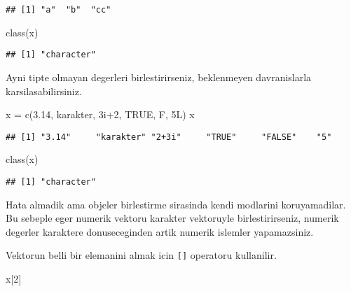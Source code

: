 \documentclass[
]{book}
\newenvironment{Shaded}{\begin{snugshade}}{\end{snugshade}}
\newcommand{\ConstantTok}[1]{\textcolor[rgb]{0.00,0.00,0.00}{#1}}
\newcommand{\DecValTok}[1]{\textcolor[rgb]{0.00,0.00,0.81}{#1}}
\newcommand{\FloatTok}[1]{\textcolor[rgb]{0.00,0.00,0.81}{#1}}
\newcommand{\FunctionTok}[1]{\textcolor[rgb]{0.00,0.00,0.00}{#1}}
\newcommand{\NormalTok}[1]{#1}
\newcommand{\OtherTok}[1]{\textcolor[rgb]{0.56,0.35,0.01}{#1}}
\newcommand{\SpecialCharTok}[1]{\textcolor[rgb]{0.00,0.00,0.00}{#1}}
\newcommand{\StringTok}[1]{\textcolor[rgb]{0.31,0.60,0.02}{#1}}
\begin{document}
\begin{verbatim}
## [1] "a"  "b"  "cc"
\end{verbatim}

\begin{Shaded}
\begin{Highlighting}[]
\FunctionTok{class}\NormalTok{(x)}
\end{Highlighting}
\end{Shaded}

\begin{verbatim}
## [1] "character"
\end{verbatim}

Ayni tipte olmayan degerleri birlestirirseniz, beklenmeyen davranislarla karsilasabilirsiniz.

\begin{Shaded}
\begin{Highlighting}[]
\NormalTok{x }\OtherTok{=} \FunctionTok{c}\NormalTok{(}\FloatTok{3.14}\NormalTok{, }\StringTok{\textquotesingle{}karakter\textquotesingle{}}\NormalTok{, 3i}\SpecialCharTok{+}\DecValTok{2}\NormalTok{, }\ConstantTok{TRUE}\NormalTok{, F, 5L)}
\NormalTok{x}
\end{Highlighting}
\end{Shaded}

\begin{verbatim}
## [1] "3.14"     "karakter" "2+3i"     "TRUE"     "FALSE"    "5"
\end{verbatim}

\begin{Shaded}
\begin{Highlighting}[]
\FunctionTok{class}\NormalTok{(x)}
\end{Highlighting}
\end{Shaded}

\begin{verbatim}
## [1] "character"
\end{verbatim}

Hata almadik ama objeler birlestirme sirasinda kendi modlarini koruyamadilar. Bu sebeple eger numerik vektoru karakter vektoruyle birlestirirseniz, numerik degerler karaktere donuseceginden artik numerik islemler yapamazsiniz.

Vektorun belli bir elemanini almak icin \texttt{{[}{]}} operatoru kullanilir.

\begin{Shaded}
\begin{Highlighting}[]
\NormalTok{x[}\DecValTok{2}\NormalTok{]}
\end{Highlighting}
\end{Shaded}
\end{document}
